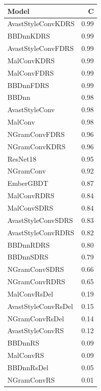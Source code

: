 \begin{tabular}{lr}
\toprule
Model & C \\
\midrule
AvastStyleConvKDRS & 0.99 \\
BBDnnKDRS & 0.99 \\
AvastStyleConvFDRS & 0.99 \\
MalConvKDRS & 0.99 \\
MalConvFDRS & 0.99 \\
BBDnnFDRS & 0.99 \\
BBDnn & 0.98 \\
AvastStyleConv & 0.98 \\
MalConv & 0.98 \\
NGramConvFDRS & 0.96 \\
NGramConvKDRS & 0.96 \\
ResNet18 & 0.95 \\
NGramConv & 0.92 \\
EmberGBDT & 0.87 \\
MalConvRDRS & 0.84 \\
MalConvSDRS & 0.84 \\
AvastStyleConvSDRS & 0.83 \\
AvastStyleConvRDRS & 0.82 \\
BBDnnRDRS & 0.80 \\
BBDnnSDRS & 0.79 \\
NGramConvSDRS & 0.66 \\
NGramConvRDRS & 0.65 \\
MalConvRsDel & 0.19 \\
AvastStyleConvRsDel & 0.15 \\
NGramConvRsDel & 0.14 \\
AvastStyleConvRS & 0.12 \\
BBDnnRS & 0.09 \\
MalConvRS & 0.09 \\
BBDnnRsDel & 0.05 \\
NGramConvRS & 0.01 \\
\bottomrule
\end{tabular}
